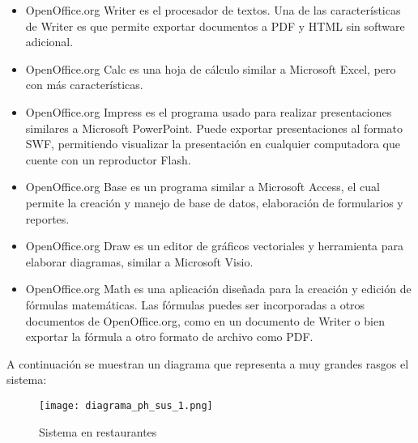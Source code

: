 \begin{itemize}
 \item OpenOffice.org Writer es el procesador de textos. Una de las características de Writer es que permite exportar documentos a PDF y HTML sin software adicional.
 \item OpenOffice.org Calc es una hoja de cálculo similar a Microsoft Excel, pero con más características.
 \item OpenOffice.org Impress es el programa usado para realizar presentaciones similares a Microsoft PowerPoint. Puede exportar presentaciones al formato SWF, permitiendo visualizar la presentación en cualquier computadora que cuente con un reproductor Flash.
 \item OpenOffice.org Base es un programa similar a Microsoft Access, el cual permite la creación y manejo de base de datos, elaboración de formularios y reportes.
 \item OpenOffice.org Draw es un editor de gráficos vectoriales y herramienta para elaborar diagramas, similar a Microsoft Visio.
 \item OpenOffice.org Math es una aplicación diseñada para la creación y edición de fórmulas matemáticas. Las fórmulas puedes ser incorporadas a otros documentos de OpenOffice.org, como en un documento de Writer o bien exportar la fórmula a otro formato de archivo como PDF.
\end{itemize}


A continuación se muestran un diagrama que representa a muy grandes rasgos el sistema:

\begin{figure}[htb]
 \begin{center}
  \texttt{[image: diagrama\_ph\_sus\_1.png]}
 \end{center}
 \caption{Sistema en restaurantes}
 \label{fig:sist_rest}
\end{figure}



